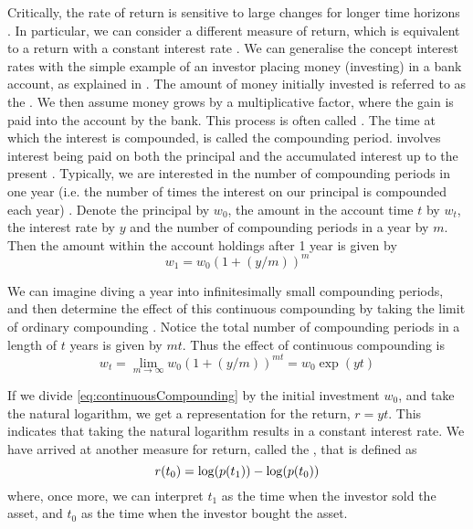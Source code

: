 Critically, the rate of return is sensitive to large changes for longer time horizons \cite{Onn02}. In particular, we can consider a different measure of return, which is equivalent to a return with a constant interest rate \cite{Onn02}. We can generalise the concept interest rates with the simple example of an investor placing money (investing) in a bank account, as explained in \cite{Kuh12c,Lue98}.
The amount of money initially invested is referred to as the . We then assume money grows by a multiplicative factor, where the gain is paid into the account by the bank. This process is often called . The time at which the interest is compounded, is called the compounding period.
 involves interest being paid on both the principal and the accumulated interest up to the present \cite{Onn02}. Typically, we are interested in the number of compounding periods in one year (i.e. the number of times the interest on our principal is compounded each year) \cite{Kuh12c}. Denote the principal by $w_{0}$, the amount in the account time $t$ by $w_{t}$, the interest rate by $y$ and the number of compounding periods in a year by $m$. Then the amount within the account holdings after 1 year is given by
\begin{equation}
	\label{eq:compoundInterest}
	w_{1} = w_{0} (1 + (y/m))^{m}
\end{equation}

We can imagine diving a year into infinitesimally small compounding periods, and then determine the effect of this continuous compounding by taking the limit of ordinary compounding \cite{Lue98}. Notice the total number of compounding periods in a length of $t$ years is given by $mt$. Thus the effect of continuous compounding is
\begin{equation}
	\label{eq:continuousCompounding}
	w_{t} = \lim_{m {\to} \infty} w_{0}(1 + (y/m))^{mt} = w_{0}\exp(yt)
\end{equation}

If we divide \cref{eq:continuousCompounding} by the initial investment $w_{0}$, and take the natural logarithm, we get a representation for the return, $r = yt$. This indicates that taking the natural logarithm results in a constant interest rate.
We have arrived at another measure for return, called the , that is defined as
\begin{equation}
	\label{eq:logarithmicReturn}
	r(t_{0}) = \log(p(t_{1})) - \log(p(t_{0}))
\end{equation}
where, once more, we can interpret $t_{1}$ as the time when the investor sold the asset, and $t_{0}$ as the time when the investor bought the asset.


